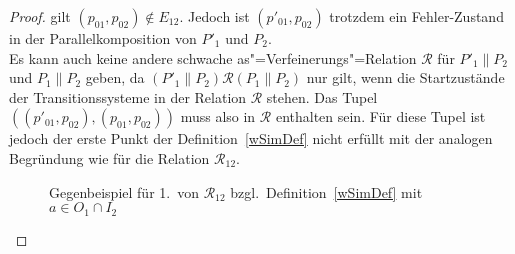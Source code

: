 \begin{proof}
  gilt $(p_{01},p_{02})\notin E_{12}$. Jedoch ist $(p'_{01},p_{02})$ trotzdem
  ein Fehler-Zustand in der Parallelkomposition von $P'_1$ und $P_2$.\\
  Es kann auch keine andere schwache as"=Verfeinerungs"=Relation $\mathcal{R}$
  für $P'_1\|P_2$ und $P_1\|P_2$ geben, da $(P'_1\|P_2) \mathcal{R} (P_1\|P_2)$
  nur gilt, wenn die Startzustände der Transitionssysteme in der Relation
  $\mathcal{R}$ stehen. Das Tupel $((p'_{01},p_{02}),(p_{01},p_{02}))$ muss
  also in $\mathcal{R}$ enthalten sein. Für diese Tupel ist jedoch der erste
  Punkt der Definition~\ref{wSimDef} nicht erfüllt mit der analogen Begründung
  wie für die Relation $\mathcal{R}_{12}$.

  \begin{figure}[h!tbp]
    \begin{center}
      \caption{Gegenbeispiel für 1.\ von $\mathcal{R}_{12}$ bzgl.\
      Definition~\ref{wSimDef} mit $a\in O_1\cap I_2$}
      \label{bsp1wSim}
    \end{center}
  \end{figure}


\end{proof}

